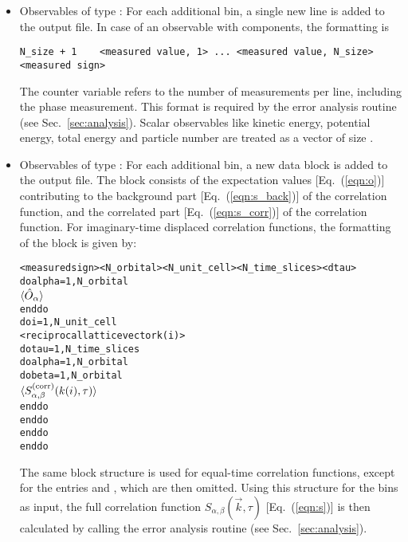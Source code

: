 \begin{itemize}
\item Observables of type :
For each additional bin, a single new line is added to the output file.
In case of an observable with  components, the formatting is 
\begin{verbatim}
N_size + 1    <measured value, 1> ... <measured value, N_size>    <measured sign>
\end{verbatim}
The counter variable  refers to the number of measurements per line, including the phase measurement. 
This format is required by the error analysis routine (see Sec.~\ref{sec:analysis}). 
Scalar observables like kinetic energy, potential energy, total energy and particle number are treated as a vector 
of size .

\item Observables of type :
For each additional bin, a new data block is added to the output file. 
The block consists of the expectation values [Eq.~(\ref{eqn:o})] contributing to the background part [Eq.~(\ref{eqn:s_back})] of the correlation function,
and the correlated part [Eq.~(\ref{eqn:s_corr})] of the correlation function.
For imaginary-time displaced correlation functions, the formatting of the block is given by:
\begin{alltt}
<measured sign>  <N_orbital>  <N_unit_cell>  <N_time_slices>  <dtau>
do alpha = 1, N_orbital
    \(\langle\hat{O}\sb{\alpha}\rangle \)
enddo
do i = 1, N_unit_cell
   <reciprocal lattice vector k(i)>
   do tau = 1, N_time_slices
      do alpha = 1, N_orbital
         do beta = 1, N_orbital
            \(\langle{S}\sb{\alpha,\beta}\sp{(\mathrm{corr})}(k(i),\tau)\rangle\)
         enddo
      enddo
   enddo
enddo
\end{alltt}
The same block structure is used for equal-time correlation functions, except for the entries   and , which are then omitted.
Using this structure for the bins as input, the full correlation function $S_{\alpha,\beta}(\vec{k},\tau)$ [Eq.~(\ref{eqn:s})] is then calculated by calling the error analysis routine (see Sec.~\ref{sec:analysis}).
\end{itemize}


%

